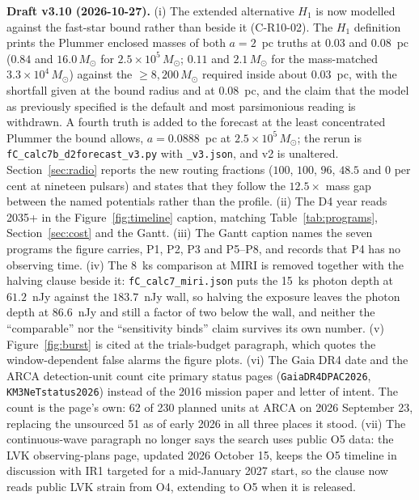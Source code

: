 \documentclass[11pt]{article}
\newcommand{\msun}{\ensuremath{M_\odot}}
\begin{document}
\textbf{Draft v3.10 (2026-10-27).} (i) The extended alternative $H_1$ is now modelled against the fast-star bound rather than beside it (C-R10-02). The $H_1$ definition prints the Plummer enclosed masses of both $a = 2$~pc truths at $0.03$ and $0.08$~pc ($0.84$ and $16.0\,\msun$ for $2.5\times10^{5}\,\msun$; $0.11$ and $2.1\,\msun$ for the mass-matched $3.3\times10^{4}\,\msun$) against the $\geq 8{,}200\,\msun$ required inside about $0.03$~pc, with the shortfall given at the bound radius and at $0.08$~pc, and the claim that the model as previously specified is the default and most parsimonious reading is withdrawn. A fourth truth is added to the forecast at the least concentrated Plummer the bound allows, $a = 0.0888$~pc at $2.5\times10^{5}\,\msun$; the rerun is \texttt{fC\_calc7b\_d2forecast\_v3.py} with \texttt{\_v3.json}, and v2 is unaltered. Section~\ref{sec:radio} reports the new routing fractions ($100$, $100$, $96$, $48.5$ and $0$ per cent at nineteen pulsars) and states that they follow the $12.5\times$ mass gap between the named potentials rather than the profile. (ii) The D4 year reads 2035+ in the Figure~\ref{fig:timeline} caption, matching Table~\ref{tab:programs}, Section~\ref{sec:cost} and the Gantt. (iii) The Gantt caption names the seven programs the figure carries, P1, P2, P3 and P5--P8, and records that P4 has no observing time. (iv) The 8~ks comparison at MIRI is removed together with the halving clause beside it: \texttt{fC\_calc7\_miri.json} puts the 15~ks photon depth at $61.2$~nJy against the $183.7$~nJy wall, so halving the exposure leaves the photon depth at $86.6$~nJy and still a factor of two below the wall, and neither the ``comparable'' nor the ``sensitivity binds'' claim survives its own number. (v) Figure~\ref{fig:burst} is cited at the trials-budget paragraph, which quotes the window-dependent false alarms the figure plots. (vi) The Gaia DR4 date and the ARCA detection-unit count cite primary status pages (\texttt{GaiaDR4DPAC2026}, \texttt{KM3NeTstatus2026}) instead of the 2016 mission paper and letter of intent. The count is the page's own: 62 of 230 planned units at ARCA on 2026 September 23, replacing the unsourced 51 as of early 2026 in all three places it stood. (vii) The continuous-wave paragraph no longer says the search uses public O5 data: the LVK observing-plans page, updated 2026 October 15, keeps the O5 timeline in discussion with IR1 targeted for a mid-January 2027 start, so the clause now reads public LVK strain from O4, extending to O5 when it is released.
\end{document}
